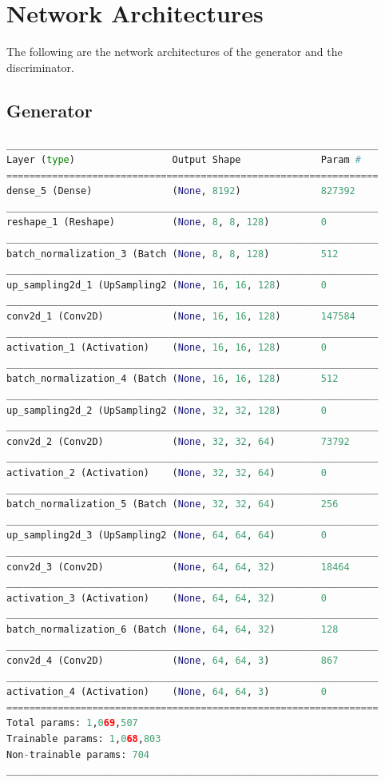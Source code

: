 \section{Network Architectures} %
\label{sec:network_architectures}
The following are the network architectures of the generator and the discriminator.

\subsection{Generator} %
\label{sub:generator}
\begin{lstlisting}[basicstyle=\scriptsize,language=Python]
_________________________________________________________________
Layer (type)                 Output Shape              Param #   
=================================================================
dense_5 (Dense)              (None, 8192)              827392    
_________________________________________________________________
reshape_1 (Reshape)          (None, 8, 8, 128)         0         
_________________________________________________________________
batch_normalization_3 (Batch (None, 8, 8, 128)         512       
_________________________________________________________________
up_sampling2d_1 (UpSampling2 (None, 16, 16, 128)       0         
_________________________________________________________________
conv2d_1 (Conv2D)            (None, 16, 16, 128)       147584    
_________________________________________________________________
activation_1 (Activation)    (None, 16, 16, 128)       0         
_________________________________________________________________
batch_normalization_4 (Batch (None, 16, 16, 128)       512       
_________________________________________________________________
up_sampling2d_2 (UpSampling2 (None, 32, 32, 128)       0         
_________________________________________________________________
conv2d_2 (Conv2D)            (None, 32, 32, 64)        73792     
_________________________________________________________________
activation_2 (Activation)    (None, 32, 32, 64)        0         
_________________________________________________________________
batch_normalization_5 (Batch (None, 32, 32, 64)        256       
_________________________________________________________________
up_sampling2d_3 (UpSampling2 (None, 64, 64, 64)        0         
_________________________________________________________________
conv2d_3 (Conv2D)            (None, 64, 64, 32)        18464     
_________________________________________________________________
activation_3 (Activation)    (None, 64, 64, 32)        0         
_________________________________________________________________
batch_normalization_6 (Batch (None, 64, 64, 32)        128       
_________________________________________________________________
conv2d_4 (Conv2D)            (None, 64, 64, 3)         867       
_________________________________________________________________
activation_4 (Activation)    (None, 64, 64, 3)         0         
=================================================================
Total params: 1,069,507
Trainable params: 1,068,803
Non-trainable params: 704
_________________________________________________________________
\end{lstlisting}

